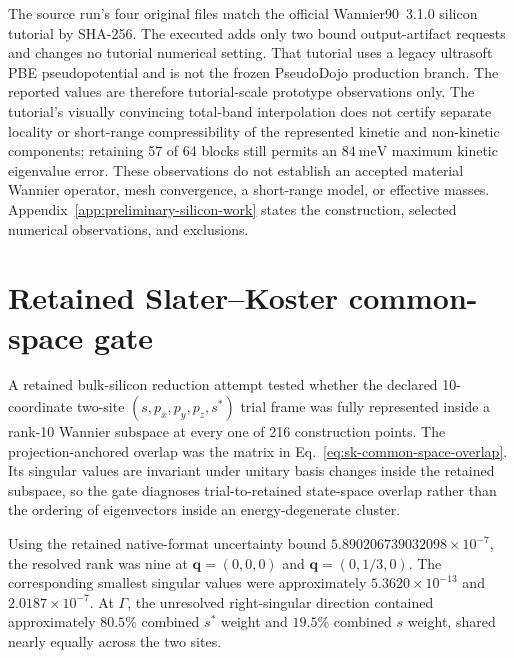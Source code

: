 The source run's four original files match the official Wannier90~3.1.0
 silicon tutorial by SHA-256. The executed
 adds only two bound output-artifact requests and changes no
tutorial numerical setting. That tutorial uses a legacy ultrasoft PBE
pseudopotential and is not the frozen PseudoDojo production
branch. The reported values are therefore tutorial-scale prototype observations
only. The tutorial's visually convincing total-band interpolation does not
certify separate locality or short-range compressibility of the represented
kinetic and non-kinetic components; retaining 57 of 64 blocks still permits an
$84\ \mathrm{meV}$ maximum kinetic eigenvalue error. These observations do not
establish an accepted material Wannier operator, mesh convergence, a short-range
model, or effective masses.
Appendix~\ref{app:preliminary-silicon-work} states the construction, selected
numerical observations, and exclusions.

\section{Retained Slater--Koster common-space gate}


A retained bulk-silicon reduction attempt tested whether the declared
10-coordinate two-site $(s,p_x,p_y,p_z,s^{\ast})$ trial frame was fully
represented inside a rank-10 Wannier subspace at every one of 216 construction
points. The projection-anchored overlap was the matrix in
Eq.~\eqref{eq:sk-common-space-overlap}. Its singular values are invariant under
unitary basis changes inside the retained subspace, so the gate diagnoses
trial-to-retained state-space overlap rather than the ordering of eigenvectors
inside an energy-degenerate cluster.

Using the retained native-format uncertainty bound
$5.890206739032098\times10^{-7}$, the resolved rank was nine at
$\mathbf q=(0,0,0)$ and $\mathbf q=(0,1/3,0)$. The corresponding smallest
singular values were approximately $5.3620\times10^{-13}$ and
$2.0187\times10^{-7}$. At $\Gamma$, the unresolved right-singular direction
contained approximately $80.5\%$ combined $s^{\ast}$ weight and $19.5\%$
combined $s$ weight, shared nearly equally across the two sites.

